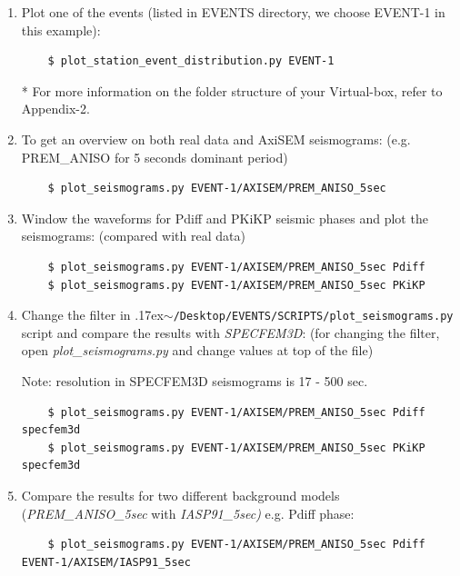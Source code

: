 \documentclass{article}
\newcommand{\ttilde}[0]{\raise.17ex\hbox{$\scriptstyle\sim$}}
\begin{document}
\begin{enumerate}
    
    \item Plot one of the events (listed in EVENTS directory, we choose EVENT-1 in this
    example):
    
    \begin{verbatim}
    $ plot_station_event_distribution.py EVENT-1
    \end{verbatim}
    * For more information on the folder structure of your Virtual-box, refer to
    Appendix-2.
    
    \item To get an overview on both real data and AxiSEM seismograms: 
    (e.g.  PREM\_ANISO for 5 seconds dominant period)
    \begin{verbatim}
    $ plot_seismograms.py EVENT-1/AXISEM/PREM_ANISO_5sec
    \end{verbatim}
    
    \item Window the waveforms for Pdiff and PKiKP seismic phases and plot the seismograms: 
    (compared with real data)
    \begin{verbatim}
    $ plot_seismograms.py EVENT-1/AXISEM/PREM_ANISO_5sec Pdiff
    $ plot_seismograms.py EVENT-1/AXISEM/PREM_ANISO_5sec PKiKP
    \end{verbatim}
    
    \item Change the filter in \ttilde\verb|/Desktop/EVENTS/SCRIPTS/plot_seismograms.py| script and compare the
    results with \textit{SPECFEM3D}: (for changing the filter, open
    \textit{plot\_seismograms.py} and change values at top of the file)
    
    Note: resolution in SPECFEM3D seismograms is 17 - 500 sec.
    \begin{verbatim}
    $ plot_seismograms.py EVENT-1/AXISEM/PREM_ANISO_5sec Pdiff specfem3d
    $ plot_seismograms.py EVENT-1/AXISEM/PREM_ANISO_5sec PKiKP specfem3d
    \end{verbatim}
    
    \item Compare the results for two different background models
    (\textit{PREM\_ANISO\_5sec} with \textit{IASP91\_5sec)} e.g. Pdiff phase:
    
    \begin{verbatim}
    $ plot_seismograms.py EVENT-1/AXISEM/PREM_ANISO_5sec Pdiff EVENT-1/AXISEM/IASP91_5sec
    \end{verbatim}
    

\end{enumerate}
\end{document}
